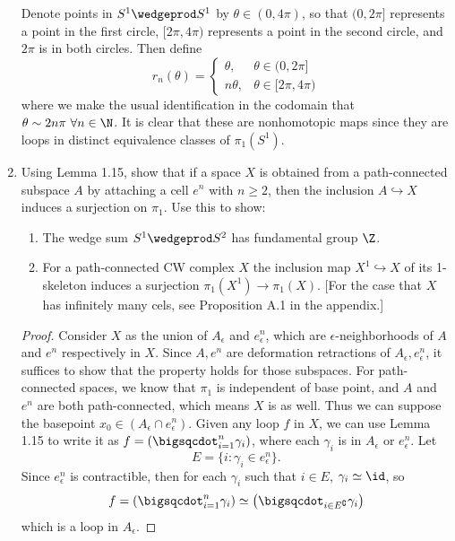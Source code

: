 \documentclass[12pt,letterpaper]{article}
\begin{document}
\begin{enumerate}
\answer Denote points in $S^1\wedgeprod S^1$ by $\theta\in(0,4\pi)$, so that $(0,2\pi]$ represents a point in the first circle, $[2\pi,4\pi)$ represents a point in the second circle, and $2\pi$ is in both circles. Then define 
\[
r_n(\theta)=\begin{cases}
\theta, &\theta \in (0,2\pi] \\
n\theta, &\theta \in [2\pi,4\pi)
\end{cases}
\]
where we make the usual identification in the codomain that $\theta\sim 2n\pi \,\,\forall n\in \N$. It is clear that these are nonhomotopic maps since they are loops in distinct equivalence classes of $\pi_1(S^1)$. 
\item 
Using Lemma 1.15, show that if a space $X$ is obtained from a path-connected subspace $A$ by attaching a cell $e^n$ with $n\geq 2$, then the inclusion $A\hookrightarrow X$ induces a surjection on $\pi_1$. Use this to show:
	\begin{enumerate}
	\item The wedge sum $S^1\wedgeprod S^2$ has fundamental group $\Z$. 
	\item For a path-connected CW complex $X$ the inclusion map $X^1\hookrightarrow X$ of its 1-skeleton induces a surjection $\pi_1(X^1)\to \pi_1(X)$. [For the case that $X$ has infinitely many cels, see Proposition A.1 in the appendix.]
	\end{enumerate}
\begin{proof}Consider $X$ as the union of $A_\epsilon$ and $e^n_\epsilon$, which are $\epsilon$-neighborhoods of $A$ and $e^n$ respectively in $X$. Since $A,e^n$ are deformation retractions of $A_\epsilon, e^n_\epsilon$, it suffices to show that the property holds for those subspaces. 
For path-connected spaces, we know that $\pi_1$ is independent of base point, and $A$ and $e^n$ are both path-connected, which means $X$ is as well. Thus \Wlog{} we can suppose the basepoint $x_0\in(A_\epsilon\cap e^n_\epsilon)$. Given any loop $f$ in $X$, we can use Lemma 1.15 to write it as $f=\left(\bigsqcdot_{i=1}^n \gamma_i\right)$, where each $\gamma_i$ is in $A_\epsilon$ or $e^n_\epsilon$. Let 
$$E=\{i:\gamma_i\in e^n_\epsilon\}.$$
Since $e^n_\epsilon$ is contractible, then for each ${\gamma_i}$ such that ${i\in E}$, $\gamma_i\simeq\id$, so 
$$f=\left(
\bigsqcdot_{i=1}^n
\gamma_i\right)\simeq \left(\bigsqcdot_{i\in E^\complement} \gamma_i\right)$$
which is a loop in $A_\epsilon$. 


\end{proof}
\end{enumerate}
\end{document}
